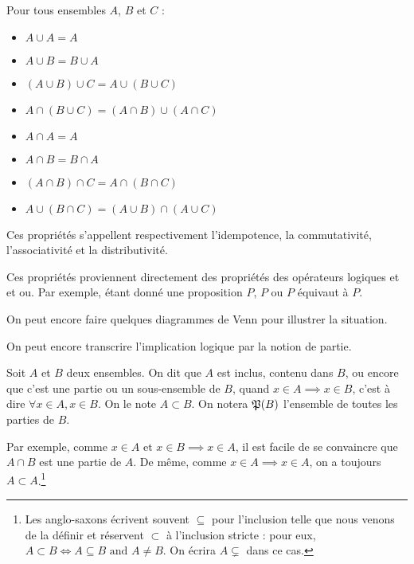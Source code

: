 \begin{prop}
    Pour tous ensembles $A$, $B$ et $C$ :
    \begin{multicols}{2}
    \begin{itemize}
        \item $A\cup A=A$
        \item $A\cup B=B\cup A$
        \item $(A\cup B)\cup C = A\cup(B\cup C)$ 
        \item $A\cap(B\cup C)=(A\cap B) \cup (A\cap C)$
        \item $A\cap A=A$
        \item $A\cap B=B\cap A$
        \item $(A\cap B)\cap C = A\cap(B\cap C)$
        \item $A\cup(B\cap C)=(A\cup B) \cap (A\cup C)$
    \end{itemize}
\end{multicols}
    Ces propriétés s'appellent respectivement l'idempotence, la commutativité, l'associativité et la distributivité.
\end{prop}
\begin{demo}
    Ces propriétés proviennent directement des propriétés des opérateurs logiques et et ou. Par exemple, étant donné une proposition $P$, $P$ ou $P$ équivaut à $P$.
\end{demo}

On peut encore faire quelques diagrammes de Venn pour illustrer la situation.

\vfill
{}
\vfill

On peut encore transcrire l'implication logique par la notion de partie.

\begin{defini}[Parties]
    Soit $A$ et $B$ deux ensembles. On dit que $A$ est inclus, contenu dans $B$, ou encore que c'est une partie ou un sous-ensemble de $B$, quand $x\in A \implies x\in B$, c'est à dire $\forall x\in A, x\in B$. On le note $A\subset B$. On notera $\mathfrak{P}(B)$ l'ensemble de toutes les parties de $B$.
\end{defini}

Par exemple, comme $x\in A \text{ et } x\in B \implies x\in A$, il est facile de se convaincre que $A\cap B$ est une partie de $A$. 
\newpage
De même, comme $x\in A \implies x\in A$, on a toujours $A\subset A$.\footnote[2]{Les anglo-saxons écrivent souvent $\subseteq$ pour l'inclusion telle que nous venons de la définir et réservent $\subset$ à l'inclusion stricte : pour eux, $A\subset B\iff A \subseteq B \text{ and } A\neq B$. On écrira $A \subsetneq$ dans ce cas.}

